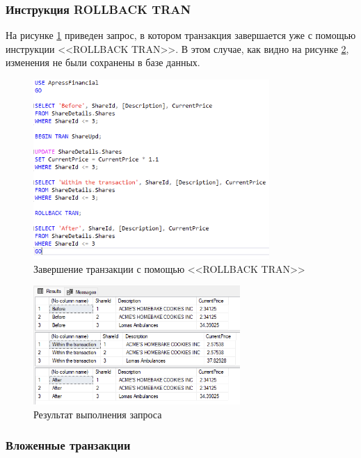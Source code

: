 \documentclass[a4paper, 14pt]{extarticle}
\begin{document}
\subsubsection{Инструкция ROLLBACK TRAN}

На рисунке \ref{fig:task-1-3} приведен запрос, в котором транзакция завершается
уже с помощью инструкции <<\foreignlanguage{english}{ROLLBACK TRAN}>>. В этом
случае, как видно на рисунке \ref{fig:task-1-4}, изменения не были сохранены в
базе данных.

\begin{figure}[H]
  \centering
  \includegraphics[width=0.8\textwidth]{images/task-1/3.png}
  \caption{
    Завершение транзакции с помощью <<\foreignlanguage{english}{ROLLBACK TRAN}>>
  }
  \label{fig:task-1-3}
\end{figure}

\begin{figure}[H]
  \centering
  \includegraphics[width=0.7\textwidth]{images/task-1/4.png}
  \caption{Результат выполнения запроса}
  \label{fig:task-1-4}
\end{figure}

\subsubsection{Вложенные транзакции}
\end{document}
